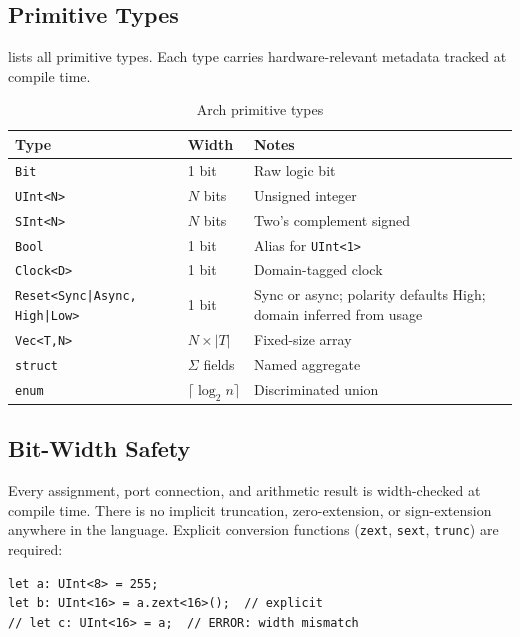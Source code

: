 \documentclass[manuscript]{acmart}
\begin{document}
\subsection{Primitive Types}

 lists all primitive types. Each type carries hardware-relevant metadata tracked at compile time.

\begin{table}[H]
\centering
\caption{Arch primitive types}
\label{tab:types}
\footnotesize
\begin{tabular}{@{}llp{3.1cm}@{}}
\toprule
\textbf{Type} & \textbf{Width} & \textbf{Notes} \\
\midrule
\texttt{Bit}             & 1 bit & Raw logic bit \\
\texttt{UInt<N>}         & $N$ bits & Unsigned integer \\
\texttt{SInt<N>}         & $N$ bits & Two's complement signed \\
\texttt{Bool}            & 1 bit & Alias for \texttt{UInt<1>} \\
\texttt{Clock<D>}        & 1 bit & Domain-tagged clock \\
\texttt{Reset<Sync|Async, High|Low>} & 1 bit & Sync or async; polarity defaults High; domain inferred from usage \\
\texttt{Vec<T,N>}        & $N \times |T|$ & Fixed-size array \\
\texttt{struct}          & $\Sigma$ fields & Named aggregate \\
\texttt{enum}            & $\lceil\log_2 n\rceil$ & Discriminated union \\
\bottomrule
\end{tabular}
\end{table}

\subsection{Bit-Width Safety}

Every assignment, port connection, and arithmetic result is width-checked at compile time. There is no implicit truncation, zero-extension, or sign-extension anywhere in the language. Explicit conversion functions (\texttt{zext}, \texttt{sext}, \texttt{trunc}) are required:

\begin{lstlisting}[language=Arch,caption={Explicit width conversion},label={lst:width}]
let a: UInt<8> = 255;
let b: UInt<16> = a.zext<16>();  // explicit
// let c: UInt<16> = a;  // ERROR: width mismatch
\end{lstlisting}
\end{document}
